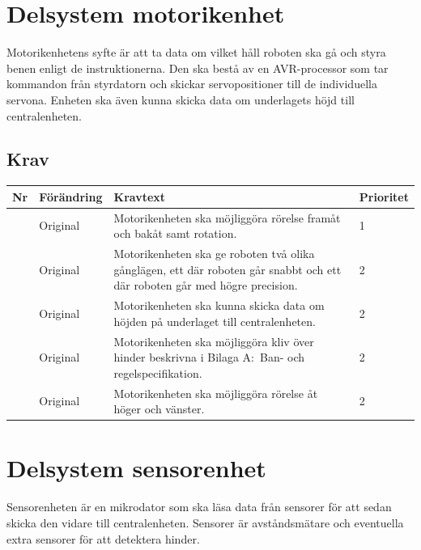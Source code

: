\documentclass[a4paper,titlepage,12pt]{article}
\newcounter{reqNr}
\newcommand{\nextReqNr}{\stepcounter{reqNr}\arabic{reqNr}}
\begin{document}

	\section{Delsystem motorikenhet}
	Motorikenhetens syfte är att ta data om vilket håll roboten ska gå och styra benen enligt de
	instruktionerna. Den ska bestå av en AVR-processor som tar kommandon från styrdatorn och skickar
	servopositioner till de individuella servona. Enheten ska även kunna skicka data om underlagets
	höjd till centralenheten.

	\subsection{Krav}
	\begin{longtable}[c]{ c l>{\raggedright}p{} l }
		\textbf{Nr} & \textbf{Förändring} & \textbf{Kravtext} & \textbf{Prioritet} 
			\\ \midrule

		\nextReqNr{} & Original & Motorikenheten ska möjliggöra rörelse framåt och 
			bakåt samt rotation. & 1
			\\ \midrule

		\nextReqNr{} & Original & Motorikenheten ska ge roboten två olika gånglägen,
			ett där roboten går 
			snabbt och ett där roboten går med högre precision.& 2
			\\ \midrule

		\nextReqNr{} & Original & Motorikenheten ska kunna skicka data om höjden 
			på underlaget till centralenheten. & 2
			\\ \midrule

		\nextReqNr{} & Original & Motorikenheten ska möjliggöra kliv över hinder 
			beskrivna i Bilaga A:\
			Ban- och regelspecifikation. & 2
			\\ \midrule

		\nextReqNr{} & Original & Motorikenheten ska möjliggöra rörelse åt höger 
			och vänster. & 2 

	\end{longtable}


	\section{Delsystem sensorenhet}
	Sensorenheten är en mikrodator som ska läsa data från sensorer för att sedan skicka 
	den vidare till centralenheten. Sensorer är avståndsmätare och eventuella extra sensorer 
	för att detektera hinder.
\end{document}
